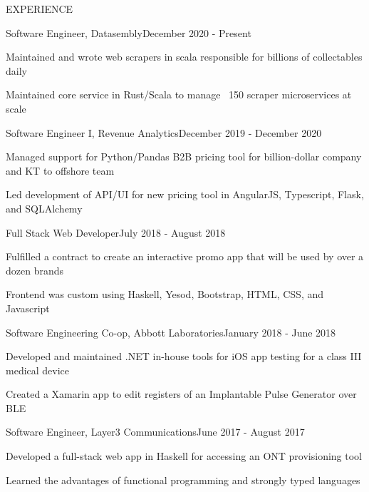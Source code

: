 \documentclass{resume} %
\begin{document}
\begin{rSection}{EXPERIENCE}

  \begin{rSubsection}{Software Engineer, Datasembly}{December 2020 - Present}{}{}
  \item Maintained and wrote web scrapers in scala responsible for billions of collectables daily
  \item Maintained core service in Rust/Scala to manage ~150 scraper microservices at scale
  \end{rSubsection} 


  \begin{rSubsection}{Software Engineer I, Revenue Analytics}{December 2019 - December 2020}{}{}
  \item Managed support for Python/Pandas B2B pricing tool for billion-dollar company and KT to offshore team
  \item Led development of API/UI for new pricing tool in AngularJS, Typescript, Flask, and SQLAlchemy
  \end{rSubsection} 


  \begin{rSubsection}{Full Stack Web Developer}{July 2018 - August 2018}{}{}
  \item Fulfilled a contract to create an interactive promo app that will be used by over a dozen brands
  \item Frontend was custom using Haskell, Yesod, Bootstrap, HTML, CSS, and Javascript
  \end{rSubsection} 


  \begin{rSubsection}{Software Engineering Co-op, Abbott Laboratories}{January 2018 - June 2018}{}{}
  \item Developed and maintained .NET in-house tools for iOS app testing for a class III medical device
  \item Created a Xamarin app to edit registers of an Implantable Pulse Generator over BLE
  \end{rSubsection} 


  \begin{rSubsection}{Software Engineer, Layer3 Communications}{June 2017 - August 2017}{}{}
  \item Developed a full-stack web app in Haskell for accessing an ONT provisioning tool
  \item Learned the advantages of functional programming and strongly typed languages
  \end{rSubsection} 


\end{rSection}
\end{document}
